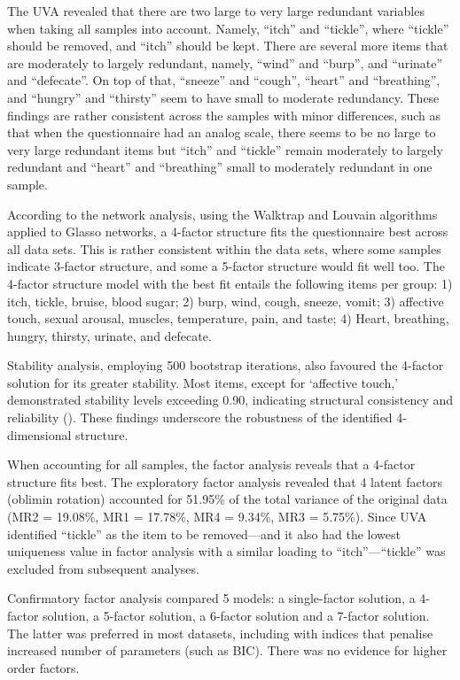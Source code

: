 \documentclass[
  man,
  floatsintext,
  longtable,
  nolmodern,
  notxfonts,
  notimes,
  colorlinks=true,linkcolor=blue,citecolor=blue,urlcolor=blue]{apa7}
\begin{document}
The UVA revealed that there are two large to very large redundant
variables when taking all samples into account. Namely, ``itch'' and
``tickle'', where ``tickle'' should be removed, and ``itch'' should be
kept. There are several more items that are moderately to largely
redundant, namely, ``wind'' and ``burp'', and ``urinate'' and
``defecate''. On top of that, ``sneeze'' and ``cough'', ``heart'' and
``breathing'', and ``hungry'' and ``thirsty'' seem to have small to
moderate redundancy. These findings are rather consistent across the
samples with minor differences, such as that when the questionnaire had
an analog scale, there seems to be no large to very large redundant
items but ``itch'' and ``tickle'' remain moderately to largely redundant
and ``heart'' and ``breathing'' small to moderately redundant in one
sample.

According to the network analysis, using the Walktrap and Louvain
algorithms applied to Glasso networks, a 4-factor structure fits the
questionnaire best across all data sets. This is rather consistent
within the data sets, where some samples indicate 3-factor structure,
and some a 5-factor structure would fit well too. The 4-factor structure
model with the best fit entails the following items per group: 1) itch,
tickle, bruise, blood sugar; 2) burp, wind, cough, sneeze, vomit; 3)
affective touch, sexual arousal, muscles, temperature, pain, and taste;
4) Heart, breathing, hungry, thirsty, urinate, and defecate.

Stability analysis, employing 500 bootstrap iterations, also favoured
the 4-factor solution for its greater stability. Most items, except for
`affective touch,' demonstrated stability levels exceeding 0.90,
indicating structural consistency and reliability
(). These
findings underscore the robustness of the identified 4-dimensional
structure.

When accounting for all samples, the factor analysis reveals that a
4-factor structure fits best. The exploratory factor analysis revealed
that 4 latent factors (oblimin rotation) accounted for 51.95\% of the
total variance of the original data (MR2 = 19.08\%, MR1 = 17.78\%, MR4 =
9.34\%, MR3 = 5.75\%). Since UVA identified ``tickle'' as the item to be
removed---and it also had the lowest uniqueness value in factor analysis
with a similar loading to ``itch''---``tickle'' was excluded from
subsequent analyses.

Confirmatory factor analysis compared 5 models: a single-factor
solution, a 4-factor solution, a 5-factor solution, a 6-factor solution
and a 7-factor solution. The latter was preferred in most datasets,
including with indices that penalise increased number of parameters
(such as BIC). There was no evidence for higher order factors.
\end{document}
